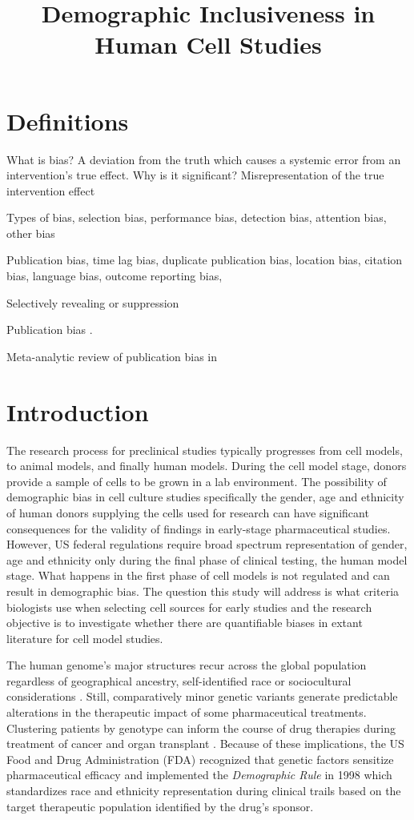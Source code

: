 \documentclass[10pt]{article}
\title{Demographic Inclusiveness in Human Cell Studies}
\begin{document}
\maketitle

\section{Definitions}
What is bias? A deviation from the truth which causes a systemic error from an intervention's true effect.
Why is it significant? Misrepresentation of the true intervention effect 

Types of bias, selection bias, performance bias, detection bias, attention bias, other bias

Publication bias, time lag bias, duplicate publication bias, location bias, citation bias, language bias, outcome reporting bias, 

Selectively revealing or suppression  

 Publication bias \cite{nakagawa2004farewell}. 
 
 Meta-analytic review of publication bias in 
  
  
\section{Introduction} 
 
The research process for preclinical studies typically progresses from cell models, to animal models, and finally human models. During the cell model stage, donors provide a sample of cells to be grown in a lab environment. The possibility of demographic bias in cell culture studies specifically the gender, age and ethnicity of human donors supplying the cells used for research can have significant consequences for the validity of findings in early-stage pharmaceutical studies. However, US federal regulations require broad spectrum representation of gender, age and ethnicity only during the final phase of clinical testing, the human model stage. What happens in the first phase of cell models is not regulated and can result in demographic bias. The question this study will address is what criteria biologists use when selecting cell sources for early studies and the research objective is to investigate whether there are quantifiable biases in extant literature for cell model studies.

The human genome's major structures recur across the global population regardless of geographical ancestry, self-identified race or sociocultural considerations \cite{xie2001molecular, cooper2003race}. Still, comparatively minor genetic variants generate predictable alterations in the therapeutic impact of some pharmaceutical treatments. Clustering patients by genotype can inform the course of drug therapies during treatment of cancer and organ transplant \cite{krynetski2000genetic, higashi2002association}. Because of these implications, the US Food and Drug Administration (FDA) recognized that genetic factors sensitize pharmaceutical efficacy and implemented the \textit{Demographic Rule} in 1998 which standardizes race and ethnicity representation during clinical trails based on the target therapeutic population identified by the drug's sponsor.
\end{document}
